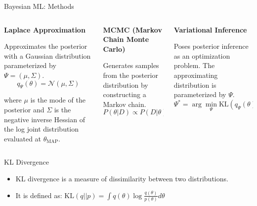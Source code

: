 \documentclass[handout]{beamer}
\begin{document}
\begin{frame}{Bayesian ML: Methods}
    \begin{columns}[T]
        \begin{column}{.33\textwidth}
            \textbf{Laplace Approximation}
            
            \vspace{0.2cm}
            Approximates the posterior with a Gaussian distribution parameterized by $\Psi = (\mu, \Sigma)$.
            {\tiny
            \[
                q_{\Psi}(\theta) = \mathcal{N}(\mu, \Sigma)
            \]}
            
            \vspace{0.2cm}
            where $\mu$ is the mode of the posterior and $\Sigma$ is the negative inverse Hessian of the log joint distribution evaluated at $\theta_{\text{MAP}}$.
        \end{column}
        
        \begin{column}{.33\textwidth}
            \textbf{MCMC (Markov Chain Monte Carlo)}
            
            \vspace{0.2cm}
            Generates samples from the posterior distribution by constructing a Markov chain.
            {\tiny
            \[
                P(\theta|D) \propto P(D|\theta)P(\theta)
            \]}
        \end{column}
        
        \begin{column}{.33\textwidth}
            \textbf{Variational Inference}
            
            \vspace{0.5cm}
            Poses posterior inference as an optimization problem. The approximating distribution is parameterized by $\Psi$.
            {\tiny
            \[
                \Psi^* = \arg\min_{\Psi} \text{KL}(q_{\Psi}(\theta)||P(\theta|D))
            \]}
        \end{column}
    \end{columns}
\end{frame}




\begin{frame}{KL Divergence}
    \begin{itemize}
        \item KL divergence is a measure of dissimilarity between two distributions.
        \item It is defined as: $\text{KL}(q||p) = \int q(\theta) \log \frac{q(\theta)}{p(\theta)} d\theta$
    \end{itemize}
    
\end{frame}
\end{document}
